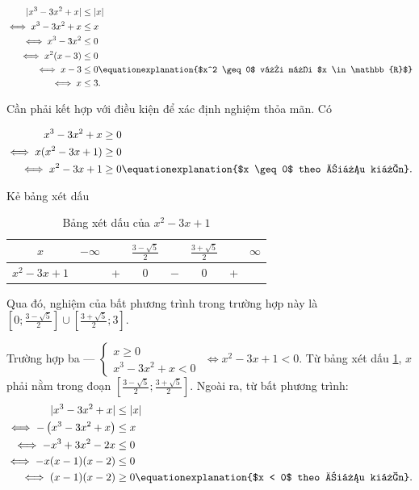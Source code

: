 \begin{align*}
   |x^3 - 3x^2 + x| &\leq |x| \\
   \iff x^3 - 3x^2 + x &\leq x \\
   \iff x^3 - 3x^2 &\leq 0 \\
   \iff x^2(x - 3) &\leq 0 \\
   \iff x - 3 &\leq 0 \equationexplanation{$x^2 \geq 0$ với mọi $x \in \mathbb{R}$} \\
   \iff x &\leq 3.
\end{align*}

Cần phải kết hợp với điều kiện để xác định nghiệm thỏa mãn. Có

\begin{align*}
   x^3 - 3x^2 + x &\geq 0 \\
   \iff x(x^2 - 3x + 1) &\geq 0 \\
   \iff x^2 - 3x + 1 &\geq 0 \equationexplanation{$x \geq 0$ theo điều kiện}.
\end{align*}

Kẻ bảng xét dấu

\begin{table}[H]
   \centering
   \begin{tabular}{|c|ccccccc|}
   \hline
   $x$           & $-\infty$ &   & $\frac{3 - \sqrt{5}}{2}$ &     & $\frac{3 + \sqrt{5}}{2}$ &   & $\infty$ \\
   \hline
   $x^{2}-3x+1$  &           & + &                 0                 & $-$ &                0                 & + &           \\
   \hline
   \end{tabular}
   \caption{Bảng xét dấu của $x^{2}-3x+1$}
   \label{tab:nen_tang_lo_gich:ham_so_mot_bien:ham_tung_phan:bxd12_x2_t3x_1}
\end{table}

Qua đó, nghiệm của bất phương trình trong trường hợp này là $\left[0; \frac{3 - \sqrt{5}}{2}\right] \cup \left[\frac{3 + \sqrt{5}}{2}; 3\right]$.

\textcolor{colorEmphasisGreen}{Trường hợp ba --- $
\begin{cases}
   x \geq 0 \\
   x^3 - 3x^2 + x < 0
\end{cases}$} $\iff x^2 - 3x + 1 < 0$. Từ bảng xét dấu \ref{tab:nen_tang_lo_gich:ham_so_mot_bien:ham_tung_phan:bxd12_x2_t3x_1}, $x$ phải nằm trong đoạn $\left[\frac{3 - \sqrt{5}}{2}; \frac{3 + \sqrt{5}}{2}\right]$. Ngoài ra, từ bất phương trình:
\begin{align*}
   |x^3 - 3x^2 + x| &\leq |x| \\
   \iff -\left(x^3 - 3x^2 + x\right) &\leq x \\
   \iff -x^3 + 3x^2 - 2x &\leq 0 \\
   \iff -x(x-1)(x-2) &\leq 0 \\
   \iff (x - 1)(x - 2) &\geq 0 \equationexplanation{$x < 0$ theo điều kiện}.
\end{align*}


